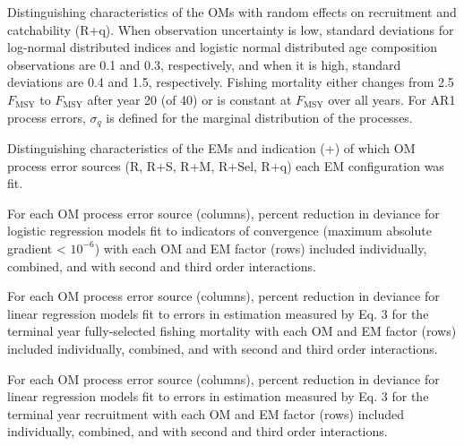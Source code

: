 \documentclass[
  12pt,
]{article}
\begin{document}
\begin{table}
\caption{Distinguishing characteristics of the OMs with random effects on recruitment and catchability (R+q). When observation uncertainty is low, standard deviations for log-normal distributed indices and logistic normal distributed age composition observations are 0.1 and 0.3, respectively, and when it is high, standard deviations are 0.4 and 1.5, respectively. Fishing mortality either changes from 2.5$F_{\text{MSY}}$ to $F_{\text{MSY}}$ after year 20 (of 40) or is constant at $F_{\text{MSY}}$ over all years. For AR1 process errors, $\sigma_q$ is defined for the marginal distribution of the processes.}\label{q_om_table}
{}
\end{table}

\begin{table}
\caption{Distinguishing characteristics of the EMs and indication (+) of which OM process error sources (R, R+S, R+M, R+Sel, R+q) each EM configuration was fit.}\label{em_table}
{\scriptsize }
\end{table}

\begin{table}
\caption{For each OM process error source (columns), percent reduction in deviance for logistic regression models fit to indicators of convergence (maximum absolute gradient < $10^{-6}$) with each OM and EM factor (rows) included individually, combined, and with second and third order interactions.}\label{convergence_gradient_PRD_table}
{}
\end{table}

\begin{table}
\caption{For each OM process error source (columns), percent reduction in deviance for linear regression models fit to errors in estimation measured by Eq. 3 for the terminal year fully-selected fishing mortality with each OM and EM factor (rows) included individually, combined, and with second and third order interactions.}\label{bias_F_PRD_table}
{}
\end{table}

\begin{table}
\caption{For each OM process error source (columns), percent reduction in deviance for linear regression models fit to errors in estimation measured by Eq. 3 for the terminal year recruitment with each OM and EM factor (rows) included individually, combined, and with second and third order interactions.}\label{bias_R_PRD_table}
{}
\end{table}
\end{document}
